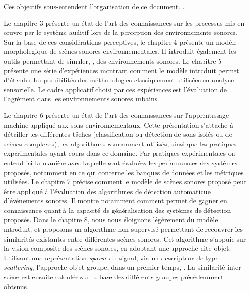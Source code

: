 Ces objectifs sous-entendent  l'organisation de ce document.  .  

  Le chapitre 3 présente un état de l'art des connaissances sur les processus mis en œuvre par le système auditif lors de la perception des environnements sonores. Sur la base de ces considérations perceptives, le chapitre 4 présente un modèle morphologique de scènes sonores environnementales. Il introduit également les outils permettant de simuler,  , des environnements sonores. Le chapitre 5 présente une série d'expériences montrant comment le modèle introduit permet d'étendre les possibilités des méthodologies classiquement utilisées en analyse sensorielle. Le cadre applicatif choisi par ces expériences est l'évaluation de l'agrément dans les environnements sonores urbains.


  Le chapitre 6 présente un état de l'art des connaissances sur l'apprentissage machine  appliqué aux sons environnementaux. Cette présentation s'attache   à détailler les différentes tâches (classification ou détection de sons isolés ou de scènes complexes), les algorithmes couramment utilisés, ainsi que les pratiques expérimentales ayant cours dans ce domaine. Par pratiques expérimentales on entend ici la manière avec laquelle sont évaluées les performances des systèmes proposés, notamment en ce qui concerne les banques de données et les métriques utilisées. Le chapitre 7 précise comment le modèle de scènes sonores proposé peut être appliqué à l'évaluation des algorithmes de détection automatique d'événements sonores. Il montre notamment comment   permet de gagner en connaissance quant à la capacité de généralisation des systèmes de détection proposés. Dans le chapitre 8, nous nous éloignons légèrement du modèle introduit, et proposons un algorithme non-supervisé permettant de recouvrer les similarités existantes entre différentes scènes sonores. Cet algorithme s'appuie sur la vision composite des scènes sonores, en adoptant une approche dite objet. Utilisant une représentation \emph{sparse} du signal, via un descripteur de type \emph{scattering}, l'approche objet groupe, dans un premier temps,  . La similarité inter-scène est ensuite calculée sur la base des différents groupes précédemment obtenus. 

